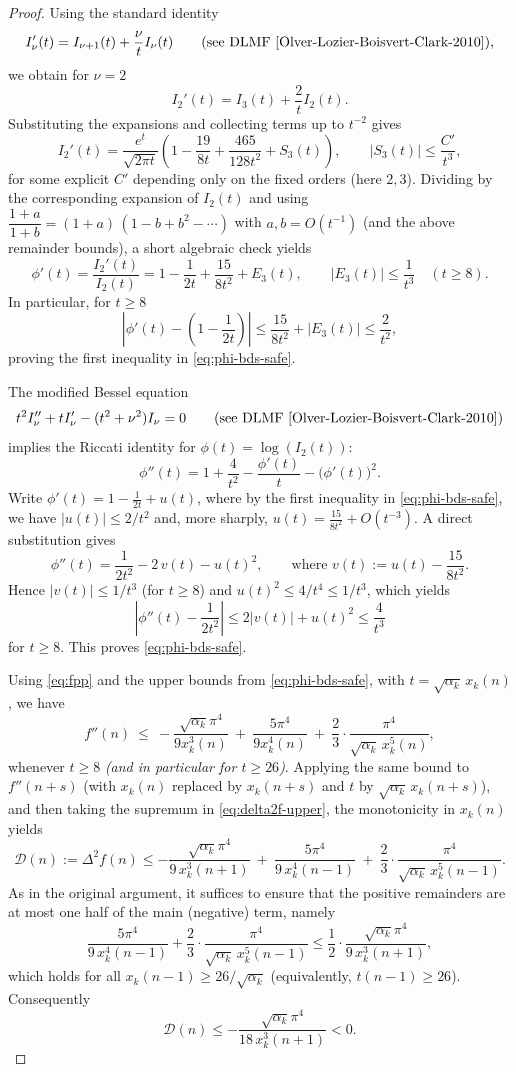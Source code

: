 \documentclass[12pt]{article}
\numberwithin{equation}{section}
\begin{document}
\begin{proof}
Using the standard identity
\[
I_\nu'(t)=I_{\nu+1}(t)+\frac{\nu}{t}I_\nu(t)
\qquad\text{(see DLMF \cite[(10.29.2)]{Olver-Lozier-Boisvert-Clark-2010})},
\]
we obtain for $\nu=2$
\[
I_2'(t)=I_3(t)+\frac{2}{t}I_2(t).
\]
Substituting the expansions and collecting terms up to $t^{-2}$ gives
\[
I_2'(t)=\frac{e^{t}}{\sqrt{2\pi t}}\left(1-\frac{19}{8t}+\frac{465}{128t^2}+S_3(t)\right),
\qquad |S_3(t)|\le \frac{C'}{t^3},
\]
for some explicit $C'$ depending only on the fixed orders (here $2,3$).
Dividing by the corresponding expansion of $I_2(t)$ and using
\(
\dfrac{1+a}{1+b}=(1+a)\,(1-b+b^2-\cdots)
\)
with $a,b=O(t^{-1})$ (and the above remainder bounds), a short algebraic check yields
\[
\phi'(t)=\frac{I_2'(t)}{I_2(t)}
=1-\frac{1}{2t}+\frac{15}{8t^2}+E_3(t),\qquad |E_3(t)|\le \frac{1}{t^3}\quad(t\ge8).
\]
In particular, for $t\ge8$
\[
\left|\phi'(t)-\left(1-\frac{1}{2t}\right)\right|\le \frac{15}{8t^2}+|E_3(t)|
\le \frac{2}{t^2},
\]
proving the first inequality in \eqref{eq:phi-bds-safe}.

The modified Bessel equation
\[
t^2 I_\nu''+t I_\nu'-(t^2+\nu^2)I_\nu=0 \qquad\text{(see DLMF \cite[\S 10.25(i)]{Olver-Lozier-Boisvert-Clark-2010})}
\]
implies the Riccati identity for $\phi(t)=\log \left(I_2(t)\right)$:
\[
\phi''(t)=1+\frac{4}{t^2}-\frac{\phi'(t)}{t}-\big(\phi'(t)\big)^2.
\]
Write $\phi'(t)=1-\tfrac{1}{2t}+u(t)$, where by the first inequality in \eqref{eq:phi-bds-safe}, we have $|u(t)|\le 2/t^2$ and, more sharply, $u(t)=\tfrac{15}{8t^2}+O(t^{-3})$. A direct substitution gives
\[
\phi''(t)=\frac{1}{2t^2}-2\,v(t)-u(t)^2,\qquad
\text{where } v(t):=u(t)-\frac{15}{8t^2}.
\]
Hence $|v(t)|\le 1/t^3$ (for $t\ge8$) and $u(t)^2\le 4/t^4\le 1/t^3$, which yields
\[
\left|\phi''(t)-\frac{1}{2t^2}\right|\le 2|v(t)|+u(t)^2\le \frac{4}{t^3}
\]
for $t\ge8$. This proves \eqref{eq:phi-bds-safe}.

Using \eqref{eq:fpp} and the upper bounds from \eqref{eq:phi-bds-safe}, with $t=\sqrt{\alpha_k}\,x_k(n)$, we have
\begin{equation*}
f''(n)\ \le\ -\frac{\sqrt{\alpha_k}\pi^4}{9x_k^3(n)}\ +\ \frac{5\pi^4}{9x_k^4(n)}\ +\ \frac{2}{3}\cdot\frac{\pi^4}{\sqrt{\alpha_k}\,x_k^5(n)},
\end{equation*}
whenever $t\ge8$ \emph{(and in particular for $t\ge 26$)}. Applying the same bound to $f''(n+s)$ (with $x_k(n)$ replaced by $x_k(n+s)$ and $t$ by $\sqrt{\alpha_k}\,x_k(n+s)$), and then taking the supremum in \eqref{eq:delta2f-upper}, the monotonicity in $x_k(n)$ yields
\[
\mathcal{D}(n):=\Delta^2 f(n) \le -\frac{\sqrt{\alpha_k}\pi^4}{9\,x_k^3(n+1)}
\ +\ \frac{5\pi^4}{9\,x_k^4(n-1)}
\ +\ \frac{2}{3}\cdot\frac{\pi^4}{\sqrt{\alpha_k}\,x_k^5(n-1)}.
\]
As in the original argument, it suffices to ensure that the positive remainders are at most one half of the main (negative) term, namely
\[
\frac{5\pi^4}{9\,x_k^4(n-1)}+\frac{2}{3}\cdot\frac{\pi^4}{\sqrt{\alpha_k}
\,x_k^5(n-1)}\le \frac{1}{2}\cdot\frac{\sqrt{\alpha_k}\pi^4}{9\,x_k^3(n+1)},
\]
which holds for all $x_k(n-1)\ge 26/\sqrt{\alpha_k}$ (equivalently, $t(n-1)\ge 26$). Consequently
\[
\mathcal{D}(n)\le -\frac{\sqrt{\alpha_k}\pi^4}{18\,x_k^3(n+1)} < 0.
\]


\end{proof}
\end{document}
